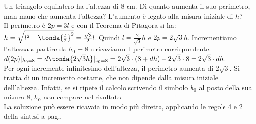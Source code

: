 \begin{esempio}
Un triangolo equilatero ha l'altezza di $8$ cm. 
Di quanto aumenta il suo perimetro, man mano che aumenta l'altezza? 
L'aumento è legato alla misura iniziale di $h$?\\
Il perimetro è $2p=3l$ e con il Teorema di Pitagora si ha: 
$h=\sqrt{l^2-\tonda{\frac{l}{2}}^2}=\frac{\sqrt{3}}{2}l$. 
Quindi $l=\frac{2}{\sqrt{3}}h$ e $2p=2\sqrt{3}h$. 
Incrementiamo l'altezza a partire da $h_0=8$ e ricaviamo il perimetro 
corrispondente.\\
$d(2p)|_{h_0=8}=
d\tonda{2\sqrt{3}h}|_{h_0=8}=
2 \sqrt{3} \cdot (8+dh)-2\sqrt{3} \cdot 8 = 2 \sqrt{3} \cdot dh$.\\
Per ogni incremento infinitesimo dell'altezza, il perimetro aumenta di 
$2 \sqrt{3}$.
Si tratta di un incremento costante, che non dipende dalla misura iniziale
dell'altezza. Infatti, se si ripete il calcolo scrivendo il simbolo $h_0$ 
al 
posto della 
sua misura $8$, $h_0$ non compare nel risultato.\\
La soluzione può essere ricavata in modo più diretto, applicando le regole
4 e 2 della sintesi a pag.\pageref{subsubsec:diff01_diffsint}.
\end{esempio}


